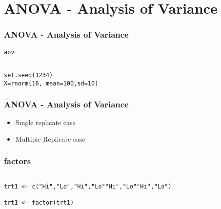 \section*{ANOVA - Analysis of Variance}
\begin{frame}[fragile]
\frametitle{ANOVA - Analysis of Variance}
\texttt{aov}

\begin{framed}
\begin{verbatim}

set.seed(1234)
X=rnorm(16, mean=100,sd=10)

\end{verbatim}
\end{framed}

\end{frame}
\begin{frame}[fragile]
\frametitle{ANOVA - Analysis of Variance}

\begin{itemize}
\item Single replicate case
\item Multiple Replicate case
\end{itemize}

\end{frame}
\begin{frame}[fragile]
\frametitle{factors}


\begin{framed}
\begin{verbatim}

trt1 <- c("Hi","Lo","Hi","Lo""Hi","Lo""Hi","Lo")

trt1 <- factor(trt1)

\end{verbatim}
\end{framed}



\end{frame}




